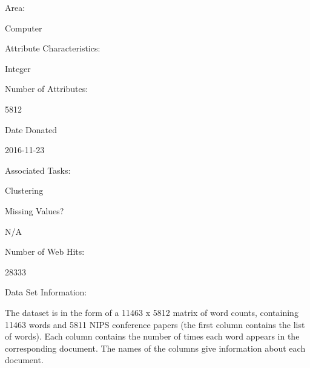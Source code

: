 \documentclass[uplatex,dvipdfmx]{jsarticle}
\begin{document}
Area:

Computer

Attribute Characteristics:

Integer

Number of Attributes:

5812

Date Donated

2016-11-23

Associated Tasks:

Clustering

Missing Values?

N/A

Number of Web Hits:

28333



Data Set Information:

The dataset is in the form of a 11463 x 5812 matrix of word counts, containing 11463 words and 5811 NIPS conference papers (the first column contains the list of words). Each column contains the number of times each word appears in the corresponding document. The names of the columns give information about each document.
\end{document}
